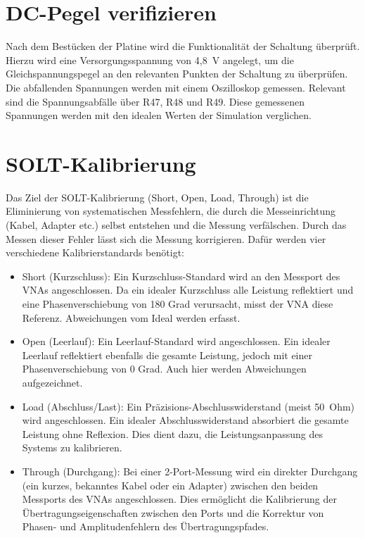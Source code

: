 \section{DC-Pegel verifizieren}
Nach dem Bestücken der Platine wird die Funktionalität der Schaltung überprüft. Hierzu wird eine Versorgungsspannung von 4,8~V angelegt, um die Gleichspannungspegel an den relevanten Punkten der Schaltung zu überprüfen. Die abfallenden Spannungen werden mit einem Oszilloskop gemessen. Relevant sind die Spannungsabfälle über R47, R48 und R49. Diese gemessenen Spannungen werden mit den idealen Werten der Simulation verglichen.

\section{SOLT-Kalibrierung}
Das Ziel der SOLT-Kalibrierung (Short, Open, Load, Through) ist die Eliminierung von systematischen Messfehlern, die durch die Messeinrichtung (Kabel, Adapter etc.) selbst entstehen und die Messung verfälschen.
Durch das Messen dieser Fehler lässt sich die Messung korrigieren.
Dafür werden vier verschiedene Kalibrierstandards benötigt:
\begin{itemize}
    \item Short (Kurzschluss): Ein Kurzschluss-Standard wird an den Messport des VNAs angeschlossen. Da ein idealer Kurzschluss alle Leistung reflektiert und eine Phasenverschiebung von 180 Grad verursacht, misst der VNA diese Referenz. Abweichungen vom Ideal werden erfasst.
    \item Open (Leerlauf): Ein Leerlauf-Standard wird angeschlossen. Ein idealer Leerlauf reflektiert ebenfalls die gesamte Leistung, jedoch mit einer Phasenverschiebung von 0 Grad. Auch hier werden Abweichungen aufgezeichnet.
    \item Load (Abschluss/Last): Ein Präzisions-Abschlusswiderstand (meist 50~Ohm) wird angeschlossen. Ein idealer Abschlusswiderstand absorbiert die gesamte Leistung ohne Reflexion. Dies dient dazu, die Leistungsanpassung des Systems zu kalibrieren.
    \item Through (Durchgang): Bei einer 2-Port-Messung wird ein direkter Durchgang (ein kurzes, bekanntes Kabel oder ein Adapter) zwischen den beiden Messports des VNAs angeschlossen. Dies ermöglicht die Kalibrierung der Übertragungseigenschaften zwischen den Ports und die Korrektur von Phasen- und Amplitudenfehlern des Übertragungspfades.
\end{itemize}

